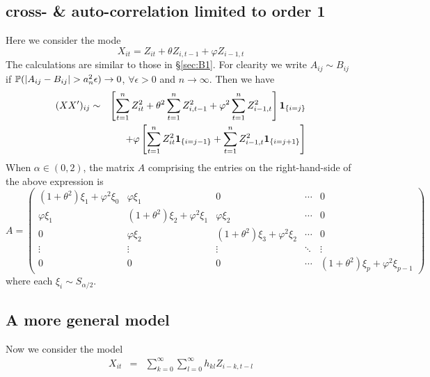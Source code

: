 \documentclass{article}
\begin{document}
\subsection{cross- \& auto-correlation limited to order 1}
Here we consider the mode
\[
X_{it} = Z_{it} + \theta Z_{i, t-1} + \varphi Z_{i-1, t}
\]
The calculations are similar to those in \S\ref{sec:B1}. For clearity
we write $A_{ij} \sim B_{ij}$ if $\mathbb{P}(|A_{ij} - B_{ij}| > a_n^2 \epsilon)
\to 0$, $\forall \epsilon > 0$ and $n \to \infty$. Then we have
\begin{eqnarray*}
  (XX')_{ij} &\sim& \left[
    \sum_{t=1}^n Z_{it}^2 + \theta^2 \sum_{t=1}^n Z_{i,t-1}^2 +
    \varphi^2 \sum_{t=1}^n Z_{i-1,t}^2 
  \right]\mathbf{1}_{\{i=j\}} \\
  && + \varphi \left[
    \sum_{t=1}^n Z_{it}^2 \mathbf{1}_{\{i=j-1\}} + \sum_{t=1}^n Z_{i-1, t}^2 \mathbf{1}_{\{i=j+1\}}
  \right]
\end{eqnarray*}
When $\alpha \in (0,2)$, the matrix $A$ comprising the entries on the
right-hand-side of the above expression is
\[
A =
\begin{pmatrix}
  (1 + \theta^2)\xi_1 + \varphi^2 \xi_0 & \varphi \xi_1 & 0 & \cdots & 0 \\
  \varphi \xi_1 & (1 + \theta^2)\xi_2 + \varphi^2 \xi_1 & \varphi \xi_2 & \cdots & 0 \\
  0 & \varphi \xi_2 & (1 + \theta^2)\xi_3 + \varphi^2 \xi_2 & \cdots & 0 \\
  \vdots & \vdots & \vdots & \ddots & \vdots \\
  0 & 0 & 0 & \cdots & (1 + \theta^2)\xi_p + \varphi^2 \xi_{p-1}
\end{pmatrix}
\]
where each $\xi_i \sim S_{\alpha/2}$.

\subsection{A more general model}
Now we consider the model
\begin{eqnarray*}
  X_{it} &=& \sum_{k=0}^\infty \sum_{l=0}^\infty h_{kl} Z_{i-k,t-l}
\end{eqnarray*}
\end{document}
